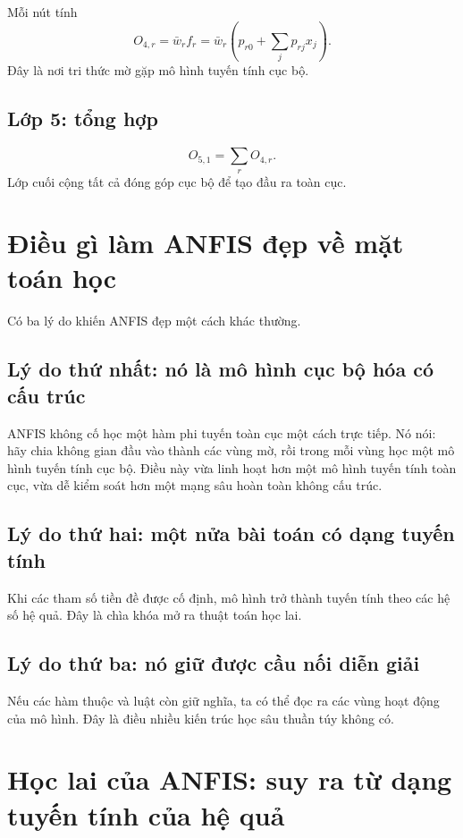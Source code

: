Mỗi nút tính
\[
O_{4,r}=\bar{w}_r f_r
=
\bar{w}_r\left(p_{r0}+\sum_j p_{rj}x_j\right).
\]
Đây là nơi tri thức mờ gặp mô hình tuyến tính cục bộ.

\subsection{Lớp 5: tổng hợp}

\[
O_{5,1}=\sum_r O_{4,r}.
\]
Lớp cuối cộng tất cả đóng góp cục bộ để tạo đầu ra toàn cục.

\section{Điều gì làm ANFIS đẹp về mặt toán học}

Có ba lý do khiến ANFIS đẹp một cách khác thường.

\subsection{Lý do thứ nhất: nó là mô hình cục bộ hóa có cấu trúc}

ANFIS không cố học một hàm phi tuyến toàn cục một cách trực tiếp. Nó nói: hãy chia không gian đầu vào thành các vùng mờ, rồi trong mỗi vùng học một mô hình tuyến tính cục bộ. Điều này vừa linh hoạt hơn một mô hình tuyến tính toàn cục, vừa dễ kiểm soát hơn một mạng sâu hoàn toàn không cấu trúc.

\subsection{Lý do thứ hai: một nửa bài toán có dạng tuyến tính}

Khi các tham số tiền đề được cố định, mô hình trở thành tuyến tính theo các hệ số hệ quả. Đây là chìa khóa mở ra thuật toán học lai.

\subsection{Lý do thứ ba: nó giữ được cầu nối diễn giải}

Nếu các hàm thuộc và luật còn giữ nghĩa, ta có thể đọc ra các vùng hoạt động của mô hình. Đây là điều nhiều kiến trúc học sâu thuần túy không có.

\section{Học lai của ANFIS: suy ra từ dạng tuyến tính của hệ quả}

